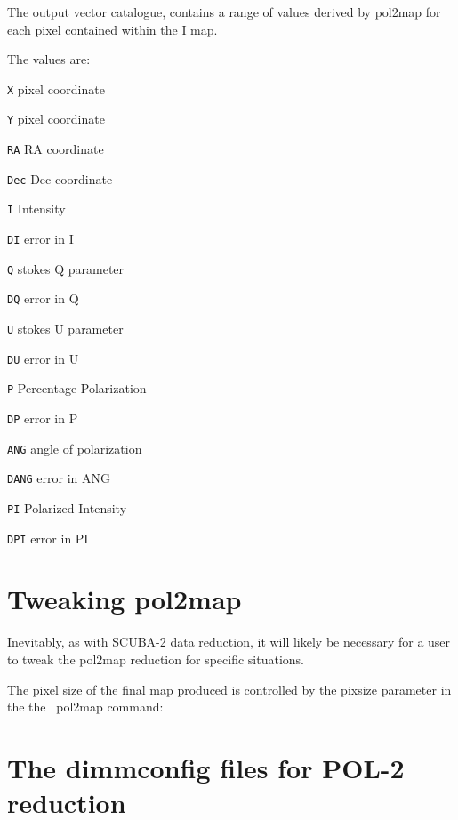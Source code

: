 The output vector catalogue, contains a range of values derived by pol2map for each pixel contained within the I map. 

The values are:

\begin{aligndesc}
\item[\texttt{X}] pixel coordinate
\item[\texttt{Y}] pixel coordinate
\item[\texttt{RA}] RA coordinate 
\item[\texttt{Dec}] Dec coordinate
\item[\texttt{I}] Intensity
\item[\texttt{DI}] error in I
\item[\texttt{Q}] stokes Q parameter
\item[\texttt{DQ}] error in Q
\item[\texttt{U}] stokes U parameter
\item[\texttt{DU}] error in U
\item[\texttt{P}] Percentage Polarization
\item[\texttt{DP}] error in P
\item[\texttt{ANG}] angle of polarization
\item[\texttt{DANG}] error in ANG
\item[\texttt{PI}] Polarized Intensity
\item[\texttt{DPI}] error in PI
\end{aligndesc}




\section{Tweaking pol2map}
\label{sec:pol2map-tweaks}

Inevitably, as with SCUBA-2 data reduction, it will likely be necessary for a user to 
tweak the pol2map reduction for specific situations.

The pixel size of the final map produced is controlled by the pixsize
parameter in the the \smurf\ pol2map command:

\begin{terminalv}
\end{terminalv}



\section{The dimmconfig files for POL-2 reduction}
\label{sec:config}

